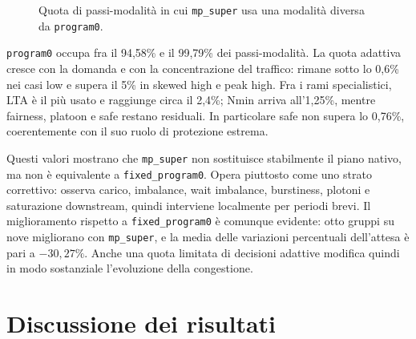 \documentclass[12pt,a4paper,oneside]{report}
\numberwithin{equation}{chapter}
\begin{document}
\begin{figure}[htbp]
    \centering
    \caption{Quota di passi-modalità in cui \texttt{mp\_super} usa una
    modalità diversa da \texttt{program0}.}
    \label{fig:super-non-program0}
\end{figure}

\texttt{program0} occupa fra il 94,58\% e il 99,79\% dei passi-modalità.
La quota adattiva cresce con la domanda e con la concentrazione del traffico:
rimane sotto lo 0,6\% nei casi low e supera il 5\% in skewed high e peak
high. Fra i rami specialistici, LTA è il più usato e raggiunge circa il 2,4\%;
Nmin arriva all'1,25\%, mentre fairness, platoon e safe restano residuali. In
particolare safe non supera lo 0,76\%, coerentemente con il suo ruolo di
protezione estrema.

Questi valori mostrano che \texttt{mp\_super} non sostituisce stabilmente il
piano nativo, ma non è equivalente a \texttt{fixed\_program0}. Opera piuttosto
come uno strato correttivo: osserva carico, imbalance, wait imbalance,
burstiness, plotoni e saturazione downstream, quindi interviene localmente per
periodi brevi. Il miglioramento rispetto a \texttt{fixed\_program0} è comunque
evidente: otto gruppi su nove migliorano con \texttt{mp\_super}, e la media
delle variazioni percentuali dell'attesa è pari a \(-30{,}27\%\). Anche una
quota limitata di decisioni adattive modifica quindi in modo sostanziale
l'evoluzione della congestione.

\section{Discussione dei risultati}
\end{document}
